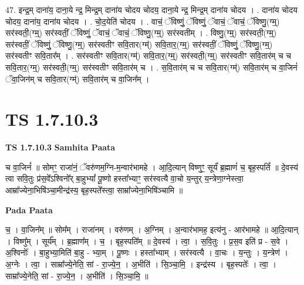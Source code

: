 \documentclass[17pt]{extarticle}
\begin{document}
47. इन्द्र॒म् दाना॑य॒ दाना॒ये न्द्र॒ मिन्द्र॒म् दाना॑य चोदय चोदय॒ दाना॒ये न्द्र॒ मिन्द्र॒म् दाना॑य चोदय । . दाना॑य चोदय चोदय॒ दाना॑य॒ दाना॑य चोदय । . चो॒द॒येति॑ चोदय । . वाचं॒ ॅविष्णुं॒ ॅविष्णुं॒ ॅवाचं॒ ॅवाचं॒ ॅविष्णु॒(ग्म्॒) सर॑स्वती॒(ग्म्॒) सर॑स्वतीं॒ ॅविष्णुं॒ ॅवाचं॒ ॅवाचं॒ ॅविष्णु॒(ग्म्॒) सर॑स्वतीम् । . विष्णु॒(ग्म्॒) सर॑स्वती॒(ग्म्॒) सर॑स्वतीं॒ ॅविष्णुं॒ ॅविष्णु॒(ग्म्॒) सर॑स्वतीꣳ सवि॒तार(ग्म्॑) सवि॒तार॒(ग्म्॒) सर॑स्वतीं॒ ॅविष्णुं॒ ॅविष्णु॒(ग्म्॒) सर॑स्वतीꣳ सवि॒तार᳚म् । . सर॑स्वतीꣳ सवि॒तार(ग्म्॑) सवि॒तार॒(ग्म्॒) सर॑स्वती॒(ग्म्॒) सर॑स्वतीꣳ सवि॒तार॑म् च च सवि॒तार॒(ग्म्॒) सर॑स्वती॒(ग्म्॒) सर॑स्वतीꣳ सवि॒तार॑म् च । . स॒वि॒तार॑म् च च सवि॒तार(ग्म्॑) सवि॒तार॑म् च वा॒जिनं॑ ॅवा॒जिन॑म् च सवि॒तार(ग्म्॑) सवि॒तार॑म् च वा॒जिन᳚म् । \newline
\pagebreak
{}
\section*{ TS 1.7.10.3 }

\textbf{TS 1.7.10.3 } \newline
\textbf{Samhita Paata} \newline

च वा॒जिनं᳚ ॥ सोमꣳ॒॒ राजा॑नं॒ ॅवरु॑णम॒ग्नि-म॒न्वार॑भामहे । आ॒दि॒त्यान् विष्णुꣳ॒॒ सूर्यं॑ ब्र॒ह्माणं॑ च॒ बृह॒स्पतिं᳚ ॥ दे॒वस्य॑ त्वा सवि॒तुः प्र॑स॒वे᳚ऽश्विनो᳚र् बा॒हुभ्यां᳚ पू॒ष्णो हस्ता᳚भ्याꣳ॒॒ सर॑स्वत्यै वा॒चो य॒न्तुर् य॒न्त्रेणा॒ग्नेस्त्वा॒ आम्रा᳚ज्येना॒भिषि॑ञ्चा॒मीन्द्र॑स्य॒ बृह॒स्पते᳚स्त्वा॒ साम्रा᳚ज्येना॒भिषि॑ञ्चामि ॥ \newline

\textbf{Pada Paata} \newline

च॒ । वा॒जिन᳚म् ॥ सोम᳚म् । राजा॑नम् । वरु॑णम् । अ॒ग्निम् । अ॒न्वार॑भामह॒ इत्य॑नु - आर॑भामहे ॥ आ॒दि॒त्यान् । विष्णु᳚म् । सूर्य᳚म् । ब्र॒ह्माण᳚म् । च॒ । बृह॒स्पति᳚म् ॥ दे॒वस्य॑ । त्वा॒ । स॒वि॒तुः । प्र॒स॒व इति॑ प्र - स॒वे । अ॒श्विनोः᳚ । बा॒हुभ्या॒मिति॑ बा॒हु - भ्या॒म् । पू॒ष्णः । हस्ता᳚भ्याम् । सर॑स्वत्यै । वा॒चः । य॒न्तुः । य॒न्त्रेण॑ । अ॒ग्नेः । त्वा॒ । साम्रा᳚ज्ये॒नेति॒ सां - रा॒ज्ये॒न॒ । अ॒भीति॑ । सि॒ञ्चा॒मि॒ । इन्द्र॑स्य । बृह॒स्पतेः᳚ । त्वा॒ । साम्रा᳚ज्ये॒नेति॒ सां - रा॒ज्ये॒न॒ । अ॒भीति॑ । सि॒ञ्चा॒मि॒ ॥  \newline
\end{document}
